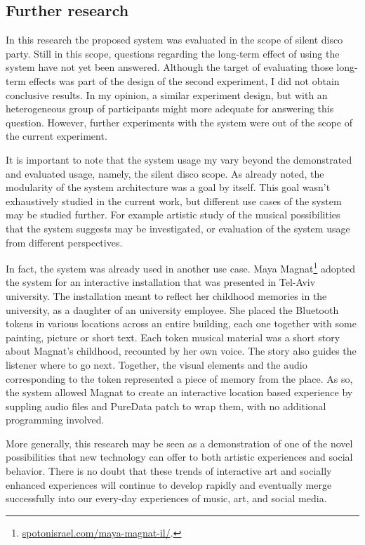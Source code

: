 \documentclass[a4paper,11pt]{article}
\begin{document}
{\subsection{Further research}

In this research the proposed system was evaluated in the scope of silent disco party.
Still in this scope, questions regarding the long-term effect of using the system have not yet been answered.
Although the target of evaluating those long-term effects was part of the design of the second experiment, I did not obtain conclusive results.
In my opinion, a similar experiment design, but with an heterogeneous group of participants might more adequate for answering this question.
However, further experiments with the system were out of the scope of the current experiment.

It is important to note that the system usage my vary beyond the demonstrated and evaluated usage, namely, the silent disco scope.
As already noted, the modularity of the system architecture was a goal by itself.
This goal wasn't exhaustively studied in the current work, but different use cases of the system may be studied further.
For example artistic study of the musical possibilities that the system suggests may be investigated, or evaluation of the system usage from different perspectives.

In fact, the system was already used in another use case.
Maya Magnat\footnote{\href{http://spotonisrael.com/maya-magnat-il/}{spotonisrael.com/maya-magnat-il/}.} adopted the system for an interactive installation that was presented in Tel-Aviv university.
The installation meant to reflect her childhood memories in the university, as a daughter of an university employee.
She placed the Bluetooth tokens in various locations across an entire building, each one together with some painting, picture or short text.
Each token musical material was a short story about Magnat's childhood, recounted by her own voice.
The story also guides the listener where to go next.
Together, the visual elements and the audio corresponding to the token represented a piece of memory from the place.
As so, the system allowed Magnat to create an interactive location based experience by suppling audio files and PureData patch to wrap them, with no additional programming involved.

More generally, this research may be seen as a demonstration of one of the novel possibilities that new technology can offer to both artistic experiences and social behavior.
There is no doubt that these trends of interactive art and socially enhanced experiences will continue to develop rapidly and eventually merge successfully into our every-day experiences of music, art, and social media.

}
\end{document}
